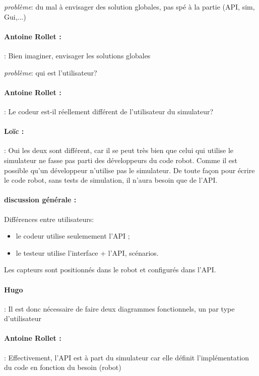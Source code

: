 \documentclass[a4paper,10pt]{article}
\begin{document}
\textit{problème}: du mal à envisager des solution globales, pas spé à la partie (API, sim, Gui,...)

\paragraph{Antoine Rollet :}: Bien imaginer, envisager les solutions globales

\textit{problème}: qui est l'utilisateur?

\paragraph{Antoine Rollet :}:
Le codeur est-il réellement différent de  l'utilisateur du simulateur?


\paragraph{Loïc :}:
Oui les deux sont différent, car il se peut très bien que celui qui utilise le simulateur
ne fasse pas parti des développeurs du code robot. Comme il est possible qu'un développeur
n'utilise pas le simulateur. De toute façon pour écrire le code robot, sans tests de simulation,
il n'aura besoin que de l'API. 

\paragraph{discussion générale :}
Différences entre utilisateurs:
\begin{itemize}
\item le codeur utilise seulemement l'API ;
\item le testeur utilise l'interface + l'API, scénarios.
\end{itemize}

Les capteurs sont positionnés dans le robot et configurés dans l'API. 

\paragraph{Hugo}:
Il est donc nécessaire de faire deux diagrammes fonctionnels, 
un par type d'utilisateur

\paragraph{Antoine Rollet :}:
Effectivement, l'API est à part du simulateur car elle définit l'implémentation du code en fonction du besoin (robot)
\end{document}
